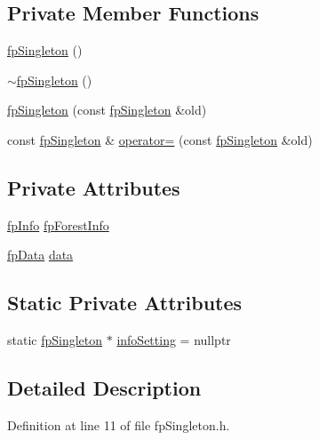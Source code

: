\subsection*{Private Member Functions}
\begin{DoxyCompactItemize}
\item 
\hyperlink{classfp_1_1fpSingleton_a049e41d4468d9b9f1e08788592c5f4cd}{fp\+Singleton} ()
\item 
\hyperlink{classfp_1_1fpSingleton_a5ea4d9f5a5811e9d9a64581dea9f561a}{$\sim$fp\+Singleton} ()
\item 
\hyperlink{classfp_1_1fpSingleton_afa7b24ca92c18b7e0f444592c9d8ba30}{fp\+Singleton} (const \hyperlink{classfp_1_1fpSingleton}{fp\+Singleton} \&old)
\item 
const \hyperlink{classfp_1_1fpSingleton}{fp\+Singleton} \& \hyperlink{classfp_1_1fpSingleton_a342b8b19aa98af5b2f56210cf0b164b0}{operator=} (const \hyperlink{classfp_1_1fpSingleton}{fp\+Singleton} \&old)
\end{DoxyCompactItemize}
\subsection*{Private Attributes}
\begin{DoxyCompactItemize}
\item 
\hyperlink{classfp_1_1fpInfo}{fp\+Info} \hyperlink{classfp_1_1fpSingleton_a85965009befa72a749ae498fa5b6ccfa}{fp\+Forest\+Info}
\item 
\hyperlink{classfp_1_1fpData}{fp\+Data} \hyperlink{classfp_1_1fpSingleton_a2fa16ac6a0f66641749032eeee61b8e9}{data}
\end{DoxyCompactItemize}
\subsection*{Static Private Attributes}
\begin{DoxyCompactItemize}
\item 
static \hyperlink{classfp_1_1fpSingleton}{fp\+Singleton} $\ast$ \hyperlink{classfp_1_1fpSingleton_a0e2c02e7e7f730f59e5c1f10005d581c}{info\+Setting} = nullptr
\end{DoxyCompactItemize}


\subsection{Detailed Description}


Definition at line 11 of file fp\+Singleton.\+h.



